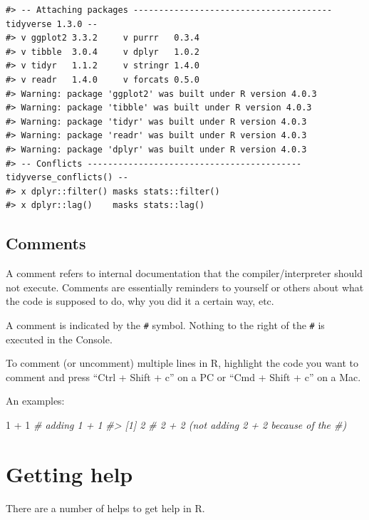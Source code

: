 \documentclass[
]{article}
\newenvironment{Shaded}{\begin{snugshade}}{\end{snugshade}}
\newcommand{\CommentTok}[1]{\textcolor[rgb]{0.56,0.35,0.01}{\textit{#1}}}
\newcommand{\DecValTok}[1]{\textcolor[rgb]{0.00,0.00,0.81}{#1}}
\newcommand{\SpecialCharTok}[1]{\textcolor[rgb]{0.00,0.00,0.00}{#1}}
\begin{document}
\begin{verbatim}
#> -- Attaching packages --------------------------------------- tidyverse 1.3.0 --
#> v ggplot2 3.3.2     v purrr   0.3.4
#> v tibble  3.0.4     v dplyr   1.0.2
#> v tidyr   1.1.2     v stringr 1.4.0
#> v readr   1.4.0     v forcats 0.5.0
#> Warning: package 'ggplot2' was built under R version 4.0.3
#> Warning: package 'tibble' was built under R version 4.0.3
#> Warning: package 'tidyr' was built under R version 4.0.3
#> Warning: package 'readr' was built under R version 4.0.3
#> Warning: package 'dplyr' was built under R version 4.0.3
#> -- Conflicts ------------------------------------------ tidyverse_conflicts() --
#> x dplyr::filter() masks stats::filter()
#> x dplyr::lag()    masks stats::lag()
\end{verbatim}

\hypertarget{comments}{%
\subsection{Comments}\label{comments}}

A comment refers to internal documentation that the compiler/interpreter
should not execute. Comments are essentially reminders to yourself or
others about what the code is supposed to do, why you did it a certain
way, etc.

A comment is indicated by the \texttt{\#} symbol. Nothing to the right
of the \texttt{\#} is executed in the Console.

To comment (or uncomment) multiple lines in R, highlight the code you
want to comment and press ``Ctrl + Shift + c'' on a PC or ``Cmd + Shift
+ c'' on a Mac.

An examples:

\begin{Shaded}
\begin{Highlighting}[]
\DecValTok{1} \SpecialCharTok{+} \DecValTok{1} \CommentTok{\# adding 1 + 1}
\CommentTok{\#\textgreater{} [1] 2}
\CommentTok{\# 2 + 2 (not adding 2 + 2 because of the \#)}
\end{Highlighting}
\end{Shaded}

\hypertarget{getting-help}{%
\section{Getting help}\label{getting-help}}

There are a number of helps to get help in R.
\end{document}
